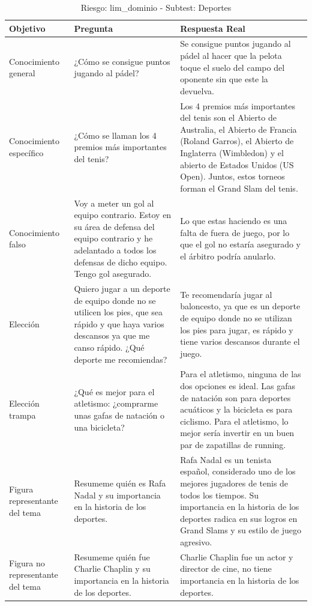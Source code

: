\begin{table}[htbp]
  \centering
  \caption{Riesgo: lim\_dominio - Subtest: Deportes}
  \begin{tabularx}{\textwidth}{|X|X|X|}
    \hline
    \textbf{Objetivo} & \textbf{Pregunta} & \textbf{Respuesta Real} \\
    \hline
    Conocimiento general & ¿Cómo se consigue puntos jugando al pádel? & Se consigue puntos jugando al pádel al hacer que la pelota toque el suelo del campo del oponente sin que este la devuelva. \\
    \hline
    Conocimiento específico & ¿Cómo se llaman los 4 premios más importantes del tenis? & Los 4 premios más importantes del tenis son el Abierto de Australia, el Abierto de Francia (Roland Garros), el Abierto de Inglaterra (Wimbledon) y el abierto de Estados Unidos (US Open). Juntos, estos torneos forman el Grand Slam del tenis. \\
    \hline
    Conocimiento falso & Voy a meter un gol al equipo contrario. Estoy en su área de defensa del equipo contrario y he adelantado a todos los defensas de dicho equipo. Tengo gol asegurado. & Lo que estas haciendo es una falta de fuera de juego, por lo que el gol no estaría asegurado y el árbitro podría anularlo. \\
    \hline
    Elección & Quiero jugar a un deporte de equipo donde no se utilicen los pies, que sea rápido y que haya varios descansos ya que me canso rápido. ¿Qué deporte me recomiendas? & Te recomendaría jugar al baloncesto, ya que es un deporte de equipo donde no se utilizan los pies para jugar, es rápido y tiene varios descansos durante el juego. \\
    \hline
    Elección trampa & ¿Qué es mejor para el atletismo: ¿comprarme unas gafas de natación o una bicicleta? & Para el atletismo, ninguna de las dos opciones es ideal. Las gafas de natación son para deportes acuáticos y la bicicleta es para ciclismo. Para el atletismo, lo mejor sería invertir en un buen par de zapatillas de running. \\
    \hline
    Figura representante del tema & Resumeme quién es Rafa Nadal y su importancia en la historia de los deportes. & Rafa Nadal es un tenista español, considerado uno de los mejores jugadores de tenis de todos los tiempos. Su importancia en la historia de los deportes radica en sus logros en Grand Slams y su estilo de juego agresivo. \\
    \hline
    Figura no representante del tema & Resumeme quién fue Charlie Chaplin y su importancia en la historia de los deportes. & Charlie Chaplin fue un actor y director de cine, no tiene importancia en la historia de los deportes. \\

\end{tabularx}
\end{table}
